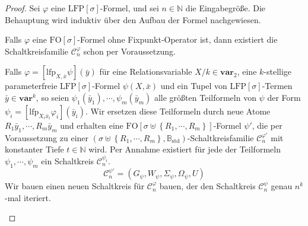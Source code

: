 \begin{proof}
Sei $\varphi$ eine $\mathrm{LFP}\left[\sigma\right]$-Formel, und
sei $n\in\mathbb{N}$ die Eingabegröße. Die Behauptung wird induktiv
über den Aufbau der Formel nachgewiesen.

\begin{casenv}
\item Falls $\varphi$ eine $\mathrm{FO}\left[\sigma\right]$-Formel ohne
Fixpunkt-Operator ist, dann existiert die Schaltkreisfamilie $\mathcal{C}_{n}^{\varphi}$
schon per Voraussetzung.
\item Falls $\varphi=\left[\mathrm{lfp}_{X,\bar{x}}\psi\right]\left(\bar{y}\right)$
für eine Relationsvariable $X/k\in\mathbf{var}_{2}$, eine $k$-stellige
parameterfreie $\mathrm{LFP}\left[\sigma\right]$-Formel $\psi\left(X,\bar{x}\right)$
und ein Tupel von $\mathrm{LFP}\left[\sigma\right]$-Termen $\bar{y}\in\mathbf{var}^{k}$,
so seien $\psi_{1}\left(\bar{y}_{1}\right),\cdots,\psi_{m}\left(\bar{y}_{m}\right)$
alle größten Teilformeln von $\psi$ der Form $\psi_{i}=\left[\mathrm{lfp}_{X_{i}\bar{x}_{i}}\varphi_{i}\right]\left(\bar{y}_{i}\right)$.
Wir ersetzen diese Teilformeln durch neue Atome $R_{1}\bar{y}_{1},\cdots,R_{m}\bar{y}_{m}$
und erhalten eine $\mathrm{FO}\left[\sigma\uplus\left\{ R_{1},\cdots,R_{m}\right\} \right]$-Formel
$\psi'$, die per Voraussetzung zu einer $\left(\sigma\uplus\left\{ R_{1},\cdots,R_{m}\right\} ,\mathbb{B}_{\mathrm{std}}\right)$-Schaltkreisfamilie
$\mathcal{C}_{n}^{\varphi'}$ mit konstanter Tiefe $t\in\mathbb{N}$
wird. Per Annahme existiert für jede der Teilformeln $\psi_{1},\cdots,\psi_{m}$
ein Schaltkreis $\mathcal{C}_{n}^{\psi_{i}}$. 
\[
\mathcal{C}_{n}^{\psi'}=\left(G_{\psi},W_{\psi},\Sigma_{\psi},\Omega_{\psi},U\right)
\]
Wir bauen einen neuen Schaltkreis für $\mathcal{C}_{n}^{\varphi}$
bauen, der den Schaltkreis $\mathcal{C}_{n}^{\psi}$ genau $n^{k}$-mal
iteriert.


\end{casenv}
\end{proof}
